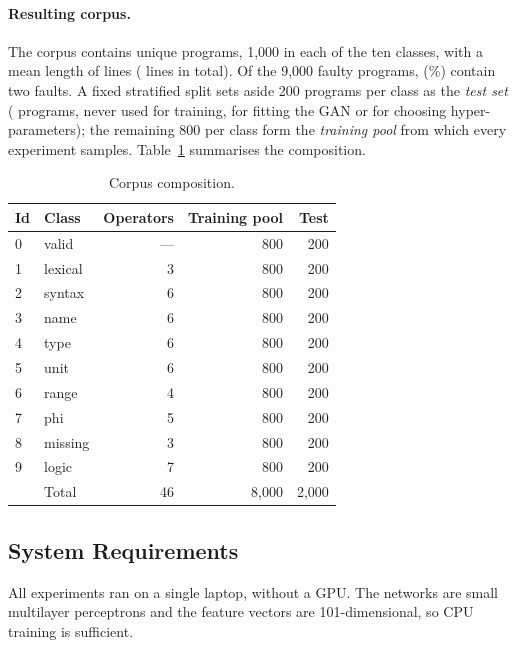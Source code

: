 \documentclass[conference]{IEEEtran}
\begin{document}
\paragraph{Resulting corpus.} The corpus contains \NProg{} unique programs, 1{,}000 in each of the ten classes, with a
mean length of \MeanLoc{} lines (\TotalLoc{} lines in total). Of the 9{,}000 faulty programs, \NDouble{}
(\DoubleShare\%) contain two faults. A fixed stratified split sets aside 200 programs per class as the \emph{test set}
(\NTest{} programs, never used for training, for fitting the GAN or for choosing hyper-parameters); the remaining
800 per class form the \emph{training pool} from which every experiment samples. Table~\ref{tab:dataset} summarises
the composition.

\begin{table}[t]
\centering
\caption{Corpus composition.}
\label{tab:dataset}
\footnotesize
\begin{tabular}{llrrr}
\toprule
\textbf{Id} & \textbf{Class} & \textbf{Operators} & \textbf{Training pool} & \textbf{Test}\\
\midrule
0 & valid & --- & 800 & 200\\
1 & lexical & 3 & 800 & 200\\
2 & syntax & 6 & 800 & 200\\
3 & name & 6 & 800 & 200\\
4 & type & 6 & 800 & 200\\
5 & unit & 6 & 800 & 200\\
6 & range & 4 & 800 & 200\\
7 & phi & 5 & 800 & 200\\
8 & missing & 3 & 800 & 200\\
9 & logic & 7 & 800 & 200\\
\midrule
 & Total & 46 & 8{,}000 & 2{,}000\\
\bottomrule
\end{tabular}
\end{table}

\subsection{System Requirements}

All experiments ran on a single laptop, without a GPU. The networks are small multilayer perceptrons and the
feature vectors are 101-dimensional, so CPU training is sufficient.
\end{document}
